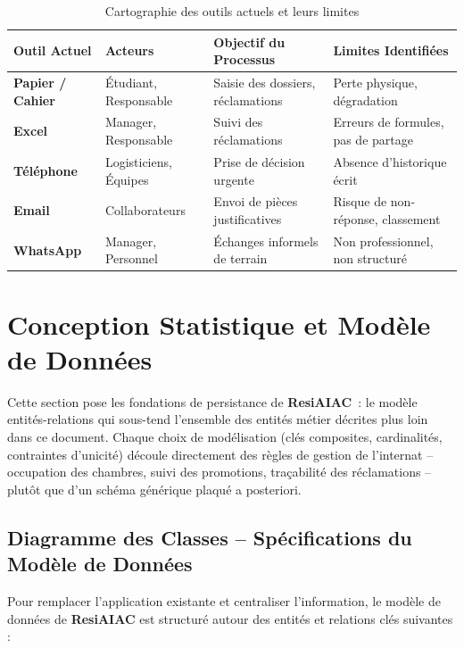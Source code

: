 \documentclass[a4paper,12pt]{article}
\begin{document}
\begin{table}[h]
\centering
\small
\begin{tabularx}{\textwidth}{l l X l}
\toprule
\textbf{Outil Actuel} & \textbf{Acteurs} & \textbf{Objectif du Processus} & \textbf{Limites Identifiées} \\
\midrule
\textbf{Papier / Cahier} & Étudiant, Responsable & Saisie des dossiers, réclamations & Perte physique, dégradation \\
\textbf{Excel} & Manager, Responsable & Suivi des réclamations & Erreurs de formules, pas de partage \\
\textbf{Téléphone} & Logisticiens, Équipes & Prise de décision urgente & Absence d'historique écrit \\
\textbf{Email} & Collaborateurs & Envoi de pièces justificatives & Risque de non-réponse, classement \\
\textbf{WhatsApp} & Manager, Personnel & Échanges informels de terrain & Non professionnel, non structuré \\
\bottomrule
\end{tabularx}
\caption{Cartographie des outils actuels et leurs limites}
\end{table}

\newpage

\section{Conception Statistique et Modèle de Données}

Cette section pose les fondations de persistance de \textbf{ResiAIAC}~: le modèle entités-relations qui sous-tend l'ensemble des entités métier décrites plus loin dans ce document. Chaque choix de modélisation (clés composites, cardinalités, contraintes d'unicité) découle directement des règles de gestion de l'internat -- occupation des chambres, suivi des promotions, traçabilité des réclamations -- plutôt que d'un schéma générique plaqué a posteriori.

\subsection{Diagramme des Classes -- Spécifications du Modèle de Données}
Pour remplacer l'application existante et centraliser l'information, le modèle de données de \textbf{ResiAIAC} est structuré autour des entités et relations clés suivantes :
\end{document}
